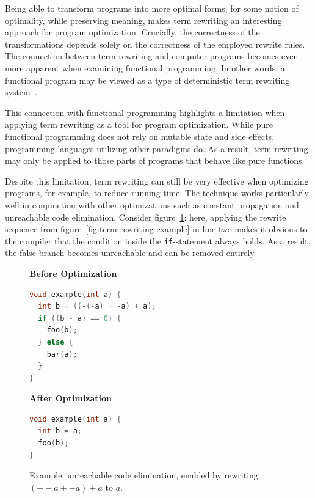 Being able to transform programs into more optimal forms, for some notion of optimality, while preserving meaning, makes term rewriting an interesting approach for program optimization. Crucially, the correctness of the transformations depends solely on the correctness of the employed rewrite rules. The connection between term rewriting and computer programs becomes even more apparent when examining functional programming. In other words, a functional program may be viewed as a type of deterministic term rewriting system~\citep{BaaderNipkow1998}. 

This connection with functional programming highlights a limitation when applying term rewriting as a tool for program optimization. While pure functional programming does not rely on mutable state and side effects, programming languages utilizing other paradigms do. As a result, term rewriting may only be applied to those parts of programs that behave like pure functions.

Despite this limitation, term rewriting can still be very effective when optimizing programs, for example, to reduce running time. The technique works particularly well in conjunction with other optimizations such as constant propagation and unreachable code elimination. Consider figure~\ref{fig:term-rewriting-dce}: here, applying the rewrite sequence from figure~\ref{fig:term-rewriting-example} in line two makes it obvious to the compiler that the condition inside the \texttt{if}-statement always holds. As a result, the false branch becomes unreachable and can be removed entirely. 

\begin{figure}[h]
	\centering
	\begin{minipage}{0.48\textwidth}
		\centering
		\textbf{Before Optimization}\\[2pt]
		\begin{lstlisting}[language=C,basicstyle=\footnotesize\ttfamily]
void example(int a) {
  int b = ((-(-a) + -a) + a);
  if ((b - a) == 0) {
  	foo(b);
  } else {
    bar(a);
  }
}
		\end{lstlisting}
	\end{minipage}
	\hfill
	\begin{minipage}{0.48\textwidth}
		\centering
		\textbf{After Optimization}\\[2pt]
		\begin{lstlisting}[language=C,basicstyle=\footnotesize\ttfamily]
void example(int a) {
  int b = a;
  foo(b);
}
		\end{lstlisting}
	\end{minipage}
	\caption{
		Example: unreachable code elimination, enabled by rewriting $(--a + -a) + a$ to $a$.
	}
	\label{fig:term-rewriting-dce}
\end{figure}

